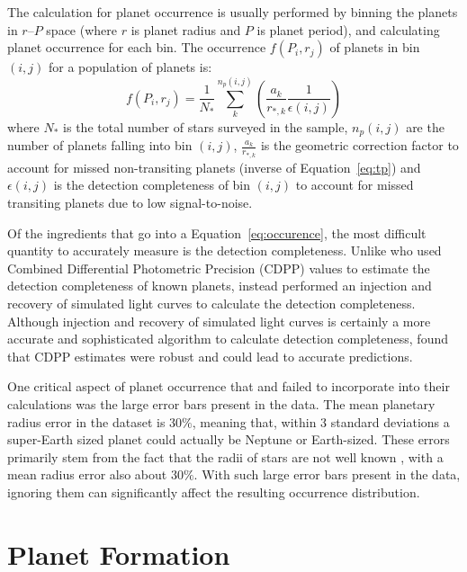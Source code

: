 The calculation for planet occurrence is usually performed by binning the planets in $r$--$P$ space (where $r$ is planet radius and $P$ is planet period), and calculating planet occurrence for each bin. 
The occurrence $f(P_i, r_j)$ of planets in bin $(i,j)$ for a population of planets is:
\begin{equation}
f(P_i, r_j) = \frac{1}{N_*} \sum_k^{n_p(i,j)} \left(\frac{a_k}{r_{*,k}} \frac{1}{\epsilon(i,j)} \right)
\label{eq:occurence}
\end{equation}
where $N_*$ is the total number of stars surveyed in the sample, $n_p(i, j)$ are the number of planets falling into bin $(i, j)$, $\frac{a_k}{r_{*,k}}$ is the geometric correction factor to account for missed non-transiting planets (inverse of Equation~\ref{eq:tp}) and $\epsilon(i,j)$ is the detection completeness of bin $(i, j)$ to account for missed transiting planets due to low signal-to-noise.

Of the ingredients that go into a Equation~\ref{eq:occurence}, the most difficult quantity to accurately measure is the detection completeness. 
Unlike \citet{Fressin2013} who used Combined Differential Photometric Precision (CDPP) values to estimate the detection completeness of known planets, \citet{Petigura2013} instead performed an injection and recovery of simulated light curves to calculate the detection completeness. 
Although injection and recovery of simulated light curves is certainly a more accurate and sophisticated algorithm to calculate detection completeness, \citet{Fressin2013} found that CDPP estimates were robust and could lead to accurate predictions. 

One critical aspect of planet occurrence that \citet{Fressin2013} and \citet{Petigura2013} failed to incorporate into their calculations was the large error bars present in the \kep data.
The mean planetary radius error in the \citet{Batalha2013} \kep dataset is $30\%$, meaning that, within 3 standard deviations a super-Earth sized planet could actually be Neptune or Earth-sized. 
These errors primarily stem from the fact that the radii of \kep stars are not well known \citep{Brown2011}, with a mean radius error also about $30\%$.
With such large error bars present in the \kep data, ignoring them can significantly affect the resulting occurrence distribution.

\section{Planet Formation}

